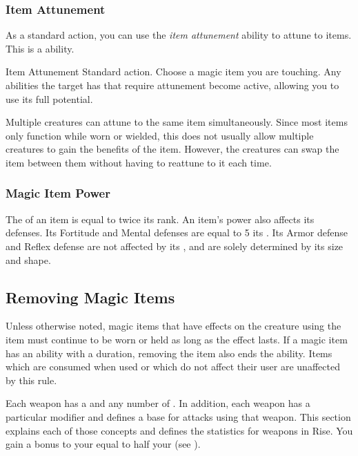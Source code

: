    \subsubsection{Item Attunement}\label{Item Attunement}

      As a standard action, you can use the \textit{item attunement} ability to attune to items.
      This is a \magical ability.

      \begin{attuneability}{Item Attunement}{}
        \abilityusagetime Standard action.
        \rankline
        Choose a magic item you are touching.
        Any abilities the target has that require attunement become active, allowing you to use its full potential.
      \end{attuneability}

       Multiple creatures can attune to the same item simultaneously.
      Since most items only function while worn or wielded, this does not usually allow multiple creatures to gain the benefits of the item.
      However, the creatures can swap the item between them without having to reattune to it each time.

    \subsubsection{Magic Item Power}\label{Magic Item Power}
      The  of an item is equal to twice its rank.
      An item's power also affects its defenses.
      Its Fortitude and Mental defenses are equal to 5 \add its .
      Its Armor defense and Reflex defense are not affected by its , and are solely determined by its size and shape.

  \subsection{Removing Magic Items}
    Unless otherwise noted, magic items that have effects on the creature using the item must continue to be worn or held as long as the effect lasts.
    If a magic item has an ability with a duration, removing the item also ends the ability.
    Items which are consumed when used or which do not affect their user are unaffected by this rule.

    \newpage
{}

  Each weapon has a  and any number of .
  In addition, each weapon has a particular  modifier and defines a base  for attacks using that weapon.
  This section explains each of those concepts and defines the statistics for weapons in Rise.
  You gain a bonus to your  equal to half your  (see ).

